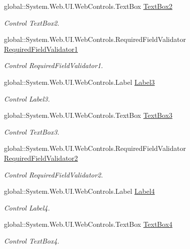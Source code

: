 \begin{DoxyCompactItemize}
global\+::\+System.\+Web.\+U\+I.\+Web\+Controls.\+Text\+Box \mbox{\hyperlink{classInicio_1_1Registro_a24be4248d4791f6b323568f814f5e5c2}{Text\+Box2}}
\begin{DoxyCompactList}\small\item\em Control Text\+Box2. \end{DoxyCompactList}\item 
global\+::\+System.\+Web.\+U\+I.\+Web\+Controls.\+Required\+Field\+Validator \mbox{\hyperlink{classInicio_1_1Registro_af596d0fdac782957e6f85a4e5d8f3ee3}{Required\+Field\+Validator1}}
\begin{DoxyCompactList}\small\item\em Control Required\+Field\+Validator1. \end{DoxyCompactList}\item 
global\+::\+System.\+Web.\+U\+I.\+Web\+Controls.\+Label \mbox{\hyperlink{classInicio_1_1Registro_ae363d31acf3834211c8e17996e39782f}{Label3}}
\begin{DoxyCompactList}\small\item\em Control Label3. \end{DoxyCompactList}\item 
global\+::\+System.\+Web.\+U\+I.\+Web\+Controls.\+Text\+Box \mbox{\hyperlink{classInicio_1_1Registro_adc45c7cdfd1ee0e80f517f1bb9e827ff}{Text\+Box3}}
\begin{DoxyCompactList}\small\item\em Control Text\+Box3. \end{DoxyCompactList}\item 
global\+::\+System.\+Web.\+U\+I.\+Web\+Controls.\+Required\+Field\+Validator \mbox{\hyperlink{classInicio_1_1Registro_a315fe7dd04ad883d4acd03f25fb7c1e9}{Required\+Field\+Validator2}}
\begin{DoxyCompactList}\small\item\em Control Required\+Field\+Validator2. \end{DoxyCompactList}\item 
global\+::\+System.\+Web.\+U\+I.\+Web\+Controls.\+Label \mbox{\hyperlink{classInicio_1_1Registro_a0cb8176c99e6ad87d5f77896e1aaf5d1}{Label4}}
\begin{DoxyCompactList}\small\item\em Control Label4. \end{DoxyCompactList}\item 
global\+::\+System.\+Web.\+U\+I.\+Web\+Controls.\+Text\+Box \mbox{\hyperlink{classInicio_1_1Registro_a835108d17c8690d089f9ee129b2ff7f3}{Text\+Box4}}
\begin{DoxyCompactList}\small\item\em Control Text\+Box4. \end{DoxyCompactList}\item 

\end{DoxyCompactItemize}
